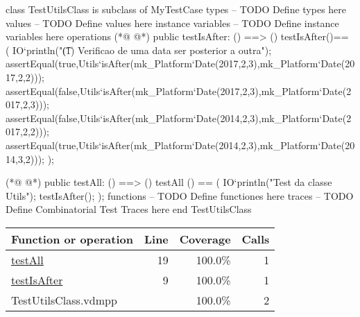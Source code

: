 \begin{vdmpp}[breaklines=true]
class TestUtilsClass is subclass of MyTestCase
types
-- TODO Define types here
values
-- TODO Define values here
instance variables
-- TODO Define instance variables here
operations
(*@
\label{testIsAfter:9}
@*)
 public testIsAfter: () ==> ()
 testIsAfter()==
 ( 
    IO`println("\t (1) Verificao de uma data ser posterior a outra");
  assertEqual(true,Utils`isAfter(mk_Platform`Date(2017,2,3),mk_Platform`Date(2017,2,2)));
  assertEqual(false,Utils`isAfter(mk_Platform`Date(2017,2,3),mk_Platform`Date(2017,2,3)));
  assertEqual(false,Utils`isAfter(mk_Platform`Date(2014,2,3),mk_Platform`Date(2017,2,2)));
  assertEqual(true,Utils`isAfter(mk_Platform`Date(2014,2,3),mk_Platform`Date(2014,3,2)));
 );
 
(*@
\label{testAll:19}
@*)
 public testAll: () ==> ()
 testAll () ==
 (
 IO`println("Test da classe Utils");
  testIsAfter();
 );
functions
-- TODO Define functiones here
traces
-- TODO Define Combinatorial Test Traces here
end TestUtilsClass
\end{vdmpp}
\bigskip
\begin{longtable}{|l|r|r|r|}
\hline
Function or operation & Line & Coverage & Calls \\
\hline
\hline
\hyperref[testAll:19]{testAll} & 19&100.0\% & 1 \\
\hline
\hyperref[testIsAfter:9]{testIsAfter} & 9&100.0\% & 1 \\
\hline
\hline
TestUtilsClass.vdmpp & & 100.0\% & 2 \\
\hline
\end{longtable}

